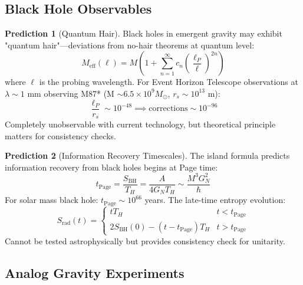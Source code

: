 \documentclass[11pt,a4paper]{article}
\theoremstyle{remark}
\theoremstyle{definition}
\newtheorem{prediction}{Prediction}[section]
\begin{document}
\subsection{Black Hole Observables}

\begin{prediction}[Quantum Hair]
Black holes in emergent gravity may exhibit "quantum hair"—deviations from no-hair theorems at quantum level:
\begin{equation}
M_{\text{eff}}(\ell) = M\left(1 + \sum_{n=1}^\infty c_n \left(\frac{\ell_P}{\ell}\right)^{2n}\right)
\end{equation}
where $\ell$ is the probing wavelength. For Event Horizon Telescope observations at $\lambda \sim 1$ mm observing M87* (M $\sim 6.5 \times 10^9 M_\odot$, $r_s \sim 10^{13}$ m):
\begin{equation}
\frac{\ell_P}{r_s} \sim 10^{-48} \implies \text{corrections} \sim 10^{-96}
\end{equation}
Completely unobservable with current technology, but theoretical principle matters for consistency checks.
\end{prediction}

\begin{prediction}[Information Recovery Timescales]
The island formula predicts information recovery from black holes begins at Page time:
\begin{equation}
t_{\text{Page}} = \frac{S_{\text{BH}}}{T_H} = \frac{A}{4G_N T_H} \sim \frac{M^3 G_N^2}{\hbar}
\end{equation}
For solar mass black hole: $t_{\text{Page}} \sim 10^{66}$ years. The late-time entropy evolution:
\begin{equation}
S_{\text{rad}}(t) = \begin{cases}
t T_H & t < t_{\text{Page}} \\
2S_{\text{BH}}(0) - (t-t_{\text{Page}})T_H & t > t_{\text{Page}}
\end{cases}
\end{equation}
Cannot be tested astrophysically but provides consistency check for unitarity.
\end{prediction}

\subsection{Analog Gravity Experiments}
\end{document}
